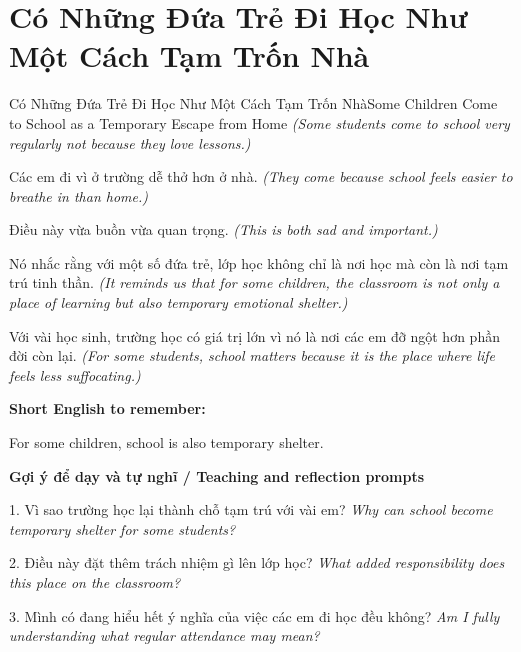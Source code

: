 \section{Có Những Đứa Trẻ Đi Học Như Một Cách Tạm Trốn Nhà}
\begin{truyen}{Có Những Đứa Trẻ Đi Học Như Một Cách Tạm Trốn Nhà}{Some Children Come to School as a Temporary Escape from Home}
\textit{(Some students come to school very regularly not because they love lessons.)}

Các em đi vì ở trường dễ thở hơn ở nhà.
\textit{(They come because school feels easier to breathe in than home.)}

Điều này vừa buồn vừa quan trọng.
\textit{(This is both sad and important.)}

Nó nhắc rằng với một số đứa trẻ, lớp học không chỉ là nơi học mà còn là nơi tạm trú tinh thần.
\textit{(It reminds us that for some children, the classroom is not only a place of learning but also temporary emotional shelter.)}

\end{truyen}

\begin{baihoc}
Với vài học sinh, trường học có giá trị lớn vì nó là nơi các em đỡ ngột hơn phần đời còn lại.
\textit{(For some students, school matters because it is the place where life feels less suffocating.)}
\end{baihoc}

\begin{ghinhoanh}
\textbf{Short English to remember:}

For some children, school is also temporary shelter.

\end{ghinhoanh}

\begin{tuhocnhanh}
\textbf{Gợi ý để dạy và tự nghĩ / Teaching and reflection prompts}

1. Vì sao trường học lại thành chỗ tạm trú với vài em? \textit{Why can school become temporary shelter for some students?}

2. Điều này đặt thêm trách nhiệm gì lên lớp học? \textit{What added responsibility does this place on the classroom?}

3. Mình có đang hiểu hết ý nghĩa của việc các em đi học đều không? \textit{Am I fully understanding what regular attendance may mean?}
\end{tuhocnhanh}
\ngancach

